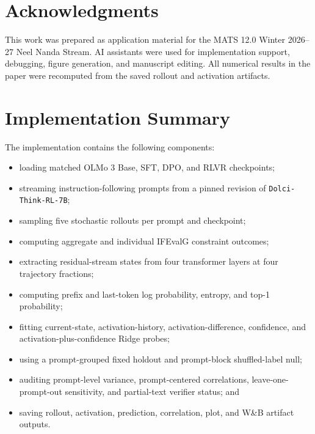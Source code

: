 \documentclass[manuscript,screen,nonacm]{acmart}
\begin{document}
\section{Acknowledgments}

This work was prepared as application material for the MATS 12.0 Winter
2026--27 Neel Nanda Stream. AI assistants were used for implementation support,
debugging, figure generation, and manuscript editing. All numerical results in
the paper were recomputed from the saved rollout and activation artifacts.




\appendix

\section{Implementation Summary}

The implementation contains the following components:

\begin{itemize}
    \item loading matched OLMo 3 Base, SFT, DPO, and RLVR checkpoints;
    \item streaming instruction-following prompts from a pinned revision of
    \texttt{Dolci-Think-RL-7B};
    \item sampling five stochastic rollouts per prompt and checkpoint;
    \item computing aggregate and individual IFEvalG constraint outcomes;
    \item extracting residual-stream states from four transformer layers at
    four trajectory fractions;
    \item computing prefix and last-token log probability, entropy, and top-1
    probability;
    \item fitting current-state, activation-history, activation-difference,
    confidence, and activation-plus-confidence Ridge probes;
    \item using a prompt-grouped fixed holdout and prompt-block shuffled-label
    null;
    \item auditing prompt-level variance, prompt-centered correlations,
    leave-one-prompt-out sensitivity, and partial-text verifier status; and
    \item saving rollout, activation, prediction, correlation, plot, and W\&B
    artifact outputs.
\end{itemize}
\end{document}
